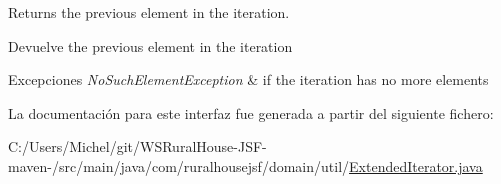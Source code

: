 Returns the previous element in the iteration.

\begin{DoxyReturn}{Devuelve}
the previous element in the iteration 
\end{DoxyReturn}

\begin{DoxyExceptions}{Excepciones}
{\em No\+Such\+Element\+Exception} & if the iteration has no more elements \\
\hline
\end{DoxyExceptions}


La documentación para este interfaz fue generada a partir del siguiente fichero\+:\begin{DoxyCompactItemize}
\item 
C\+:/\+Users/\+Michel/git/\+W\+S\+Rural\+House-\/\+J\+S\+F-\/maven-\//src/main/java/com/ruralhousejsf/domain/util/\mbox{\hyperlink{_extended_iterator_8java}{Extended\+Iterator.\+java}}\end{DoxyCompactItemize}
